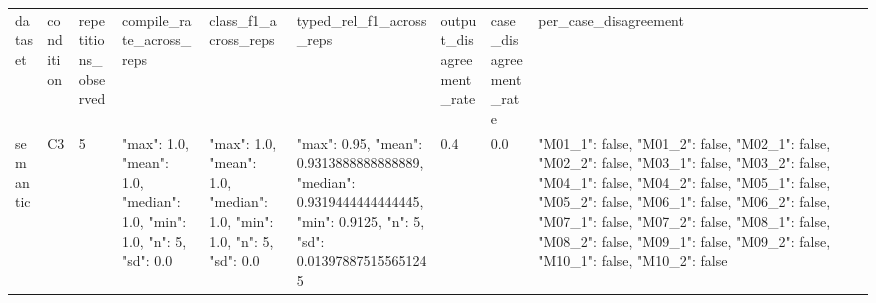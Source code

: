 \begin{tabular}{lllllllll}
dataset & condition & repetitions\_observed & compile\_rate\_across\_reps & class\_f1\_across\_reps & typed\_rel\_f1\_across\_reps & output\_disagreement\_rate & case\_disagreement\_rate & per\_case\_disagreement \\
semantic & C3 & 5 & {"max": 1.0, "mean": 1.0, "median": 1.0, "min": 1.0, "n": 5, "sd": 0.0} & {"max": 1.0, "mean": 1.0, "median": 1.0, "min": 1.0, "n": 5, "sd": 0.0} & {"max": 0.95, "mean": 0.9313888888888889, "median": 0.9319444444444445, "min": 0.9125, "n": 5, "sd": 0.013978875155651245} & 0.4 & 0.0 & {"M01\_1": false, "M01\_2": false, "M02\_1": false, "M02\_2": false, "M03\_1": false, "M03\_2": false, "M04\_1": false, "M04\_2": false, "M05\_1": false, "M05\_2": false, "M06\_1": false, "M06\_2": false, "M07\_1": false, "M07\_2": false, "M08\_1": false, "M08\_2": false, "M09\_1": false, "M09\_2": false, "M10\_1": false, "M10\_2": false} \\
\end{tabular}